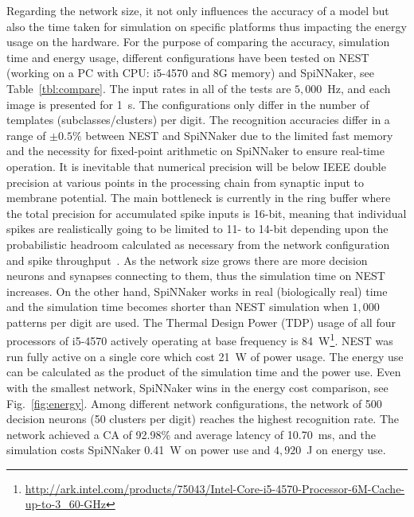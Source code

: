 Regarding the network size, it not only influences the accuracy of a model but also the time taken for simulation on specific platforms thus impacting the energy usage on the hardware.
For the purpose of comparing the accuracy, simulation time and energy usage, different configurations have been tested on NEST (working on a PC with CPU: i5-4570 and 8G memory) and SpiNNaker, see Table~\ref{tbl:compare}.
The input rates in all of the tests are $5,000$~Hz, and each image is presented for 1~s.
The configurations only differ in the number of templates (subclasses/clusters) per digit.
The recognition accuracies differ in a range of $\pm0.5\%$ between NEST and SpiNNaker due to the limited fast memory and the necessity for fixed-point arithmetic on SpiNNaker to ensure real-time operation.
It is inevitable that numerical precision will be below IEEE double precision at various points in the processing chain from synaptic input to membrane potential.
The main bottleneck is currently in the ring buffer where the total precision for accumulated spike inputs is 16-bit, meaning that individual spikes are realistically going to be limited to 11- to 14-bit depending upon the probabilistic headroom calculated as necessary from the network configuration and spike throughput~\citep{Hopkins2015Accuracy}.
As the network size grows there are more decision neurons and synapses connecting to them, thus the simulation time on NEST increases.
On the other hand, SpiNNaker works in real (biologically real) time and the simulation time becomes shorter than NEST simulation when $1,000$ patterns per digit are used.
The Thermal Design Power (TDP) usage of all four processors of i5-4570 actively operating at base frequency is 84~W\footnote{\url{http://ark.intel.com/products/75043/Intel-Core-i5-4570-Processor-6M-Cache-up-to-3_60-GHz}}.
NEST was run fully active on a single core which cost 21~W of power usage.
The energy use can be calculated as the product of the simulation time and the power use.
Even with the smallest network, SpiNNaker wins in the energy cost comparison, see Fig.~\ref{fig:energy}.
Among different network configurations, the network of 500 decision neurons (50 clusters per digit) reaches the highest recognition rate.
The network achieved a CA of 92.98\% and average latency of 10.70~ms, and the simulation costs SpiNNaker 0.41~W on power use and $4,920$~J on energy use.


